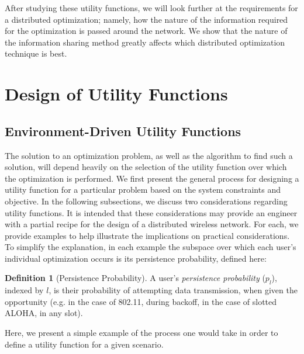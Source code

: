 \documentclass[11pt]{IEEEtran}
\theoremstyle{definition}
\newtheorem{definition}{Definition}
\begin{document}
After studying these utility functions, we will look further at the requirements for a distributed optimization; namely, how the nature of the information required for the optimization is passed around the network. We show that the nature of the information sharing method greatly affects which distributed optimization technique is best. 





\section{Design of Utility Functions}
\subsection{Environment-Driven Utility Functions}
The solution to an optimization problem, as well as the algorithm to find such a solution, will depend heavily on the selection of the utility function over which the optimization is performed. We first present the general process for designing a utility function for a particular problem based on the system constraints and objective.
%
In the following subsections, we discuss two considerations regarding utility functions. It is intended that these considerations may provide an engineer with a partial recipe for the design of a distributed wireless network. For each, we provide examples to help illustrate the implications on practical considerations. 
%
To simplify the explanation, in each example the subspace over which each user's individual optimization occurs is its persistence probability, defined here:
\begin{definition}[Persistence Probability]
	A user's \emph{persistence probability} ($p_l$), indexed by $l$, is their probability of attempting data transmission, when given the opportunity (e.g. in the case of 802.11, during backoff, in the case of slotted ALOHA, in any slot).
\end{definition}

Here, we present a simple example of the process one would take in order to define a utility function for a given scenario.
\end{document}
